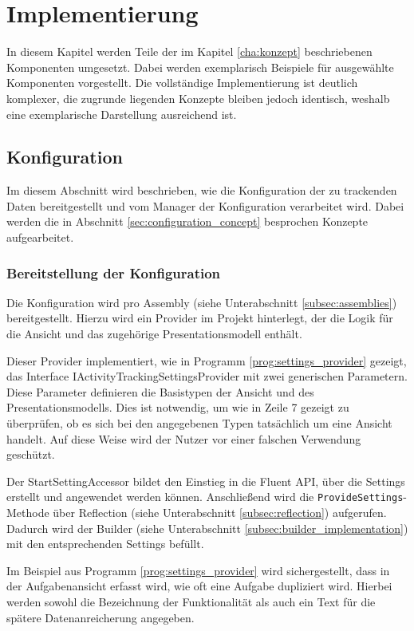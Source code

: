 \chapter{Implementierung}
\label{cha:implementierung}
In diesem Kapitel werden Teile der im Kapitel \ref{cha:konzept} beschriebenen Komponenten umgesetzt. Dabei werden exemplarisch Beispiele für ausgewählte Komponenten vorgestellt.  
Die vollständige Implementierung ist deutlich komplexer, die zugrunde liegenden Konzepte bleiben jedoch identisch, weshalb eine exemplarische Darstellung ausreichend ist.

\section{Konfiguration}
\label{sec:configuration_impl}
Im diesem Abschnitt wird beschrieben, wie die Konfiguration der zu trackenden Daten bereitgestellt und vom Manager der Konfiguration verarbeitet wird. Dabei werden die in Abschnitt \ref{sec:configuration_concept} besprochen Konzepte aufgearbeitet.

\subsection{Bereitstellung der Konfiguration}
Die Konfiguration wird pro Assembly (siehe Unterabschnitt \ref{subsec:assemblies}) bereitgestellt. Hierzu wird ein Provider im Projekt hinterlegt, der die Logik für die Ansicht und das zugehörige Presentationsmodell enthält.

Dieser Provider implementiert, wie in Programm \ref{prog:settings_provider} gezeigt, das Interface IActivityTrackingSettingsProvider mit zwei generischen Parametern. Diese Parameter definieren die Basistypen der Ansicht und des Presentationsmodells. Dies ist notwendig, um wie in Zeile 7 gezeigt zu überprüfen, ob es sich bei den angegebenen Typen tatsächlich um eine Ansicht handelt. Auf diese Weise wird der Nutzer vor einer falschen Verwendung geschützt.

Der StartSettingAccessor bildet den Einstieg in die Fluent API, über die Settings erstellt und angewendet werden können. Anschließend wird die \texttt{ProvideSettings}-Methode über Reflection (siehe Unterabschnitt \ref{subsec:reflection}) aufgerufen. Dadurch wird der Builder (siehe Unterabschnitt \ref{subsec:builder_implementation}) mit den entsprechenden Settings befüllt.

Im Beispiel aus Programm \ref{prog:settings_provider} wird sichergestellt, dass in der Aufgabenansicht erfasst wird, wie oft eine Aufgabe dupliziert wird. Hierbei werden sowohl die Bezeichnung der Funktionalität als auch ein Text für die spätere Datenanreicherung angegeben.

